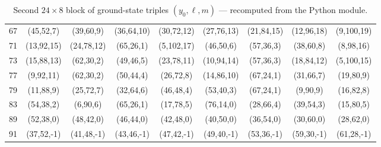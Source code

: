 \documentclass[11pt,a4paper]{article}
\begin{document}
\begin{table}[htbp]
\begin{tabular}{c|cccccccc}
67 & (45,52,7) & (39,60,9) & (36,64,10) & (30,72,12) & (27,76,13) & (21,84,15) & (12,96,18) & (9,100,19) \\
71 & (13,92,15) & (24,78,12) & (65,26,1) & (5,102,17) & (46,50,6) & (57,36,3) & (38,60,8) & (8,98,16) \\
73 & (15,88,13) & (62,30,2) & (49,46,5) & (23,78,11) & (10,94,14) & (57,36,3) & (18,84,12) & (5,100,15) \\
77 & (9,92,11) & (62,30,2) & (50,44,4) & (26,72,8) & (14,86,10) & (67,24,1) & (31,66,7) & (19,80,9) \\
79 & (11,88,9) & (25,72,7) & (32,64,6) & (46,48,4) & (53,40,3) & (67,24,1) & (9,90,9) & (16,82,8) \\
83 & (54,38,2) & (6,90,6) & (65,26,1) & (17,78,5) & (76,14,0) & (28,66,4) & (39,54,3) & (15,80,5) \\
89 & (52,38,0) & (48,42,0) & (46,44,0) & (42,48,0) & (40,50,0) & (36,54,0) & (30,60,0) & (28,62,0) \\
91 & (37,52,-1) & (41,48,-1) & (43,46,-1) & (47,42,-1) & (49,40,-1) & (53,36,-1) & (59,30,-1) & (61,28,-1) \\
\end{tabular}
\caption{Second \(24 \times 8\) block of ground-state triples \((y_0, \ell, m)\) — recomputed from the Python module.}
\label{tab:ym-block2-recomputed}
\end{table}
\end{document}
